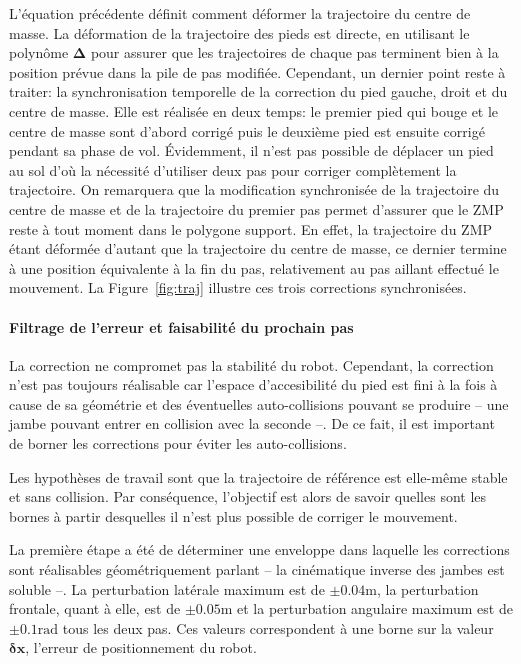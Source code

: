 L'équation précédente définit comment déformer la trajectoire du
centre de masse. La déformation de la trajectoire des pieds est
directe, en utilisant le polynôme $\mathbf{\Delta}$ pour assurer que
les trajectoires de chaque pas terminent bien à la position prévue
dans la pile de pas modifiée. Cependant, un dernier point reste à
traiter: la synchronisation temporelle de la correction du pied
gauche, droit et du centre de masse. Elle est réalisée en deux temps:
le premier pied qui bouge et le centre de masse sont d'abord corrigé
puis le deuxième pied est ensuite corrigé pendant sa phase de
vol. Évidemment, il n'est pas possible de déplacer un pied au sol d'où
la nécessité d'utiliser deux pas pour corriger complètement la
trajectoire. On remarquera que la modification synchronisée de la
trajectoire du centre de masse et de la trajectoire du premier pas
permet d'assurer que le ZMP reste à tout moment dans le polygone
support. En effet, la trajectoire du ZMP étant déformée d'autant que
la trajectoire du centre de masse, ce dernier termine à une position
équivalente à la fin du pas, relativement au pas aillant effectué le
mouvement. La Figure~\ref{fig:traj} illustre ces trois corrections
synchronisées.


\paragraph{Filtrage de l'erreur et faisabilité du prochain pas}


La correction ne compromet pas la stabilité du robot. Cependant, la
correction n'est pas toujours réalisable car l'espace d'accesibilité
du pied est fini à la fois à cause de sa géométrie et des éventuelles
auto-collisions pouvant se produire -- une jambe pouvant entrer en
collision avec la seconde --. De ce fait, il est important de borner
les corrections pour éviter les auto-collisions.


Les hypothèses de travail sont que la trajectoire de référence est
elle-même stable et sans collision. Par conséquence, l'objectif est
alors de savoir quelles sont les bornes à partir desquelles il n'est
plus possible de corriger le mouvement.


La première étape a été de déterminer une enveloppe dans laquelle les
corrections sont réalisables géométriquement parlant -- la cinématique
inverse des jambes est soluble --. La perturbation latérale maximum
est de $\pm 0.04 \mathrm{m}$, la perturbation frontale, quant à elle,
est de $\pm 0.05 \mathrm{m}$ et la perturbation angulaire maximum est
de $\pm 0.1 \mathrm{rad}$ tous les deux pas. Ces valeurs correspondent
à une borne sur la valeur $\mathbf{\delta {x}}$, l'erreur de
positionnement du robot.


